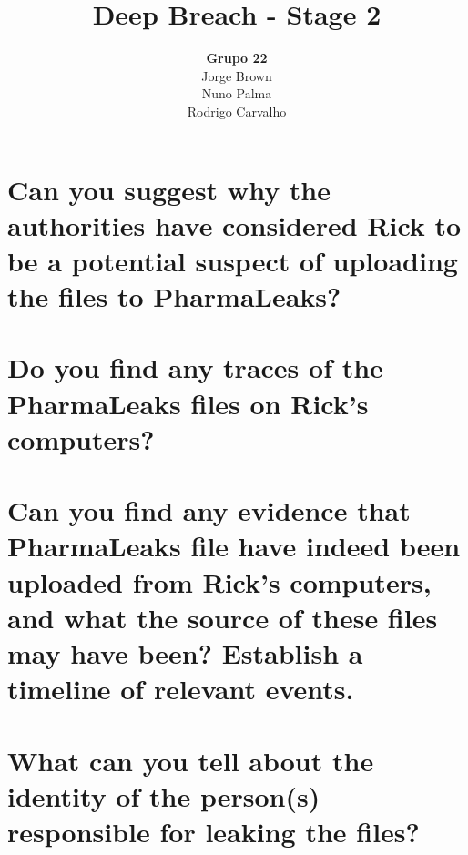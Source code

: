 \documentclass{report}
\author{\textbf{\huge{Grupo 22}}\vspace{2cm}\\Jorge Brown\\Nuno Palma\\Rodrigo Carvalho}
\title{\textbf{\Huge{Deep Breach - Stage 2}}}
\begin{document}
    \maketitle
    \tableofcontents
    \newpage

    \section{Can you suggest why the authorities have considered Rick to be a potential suspect of uploading the files to PharmaLeaks?}
    

    \section{Do you find any traces of the PharmaLeaks files on Rick’s computers?}
    

    \section{Can you find any evidence that PharmaLeaks file have indeed been uploaded from Rick’s computers, and what the source of these files may have been? Establish a timeline of relevant events.}
    

    \section{What can you tell about the identity of the person(s) responsible for leaking the files?}
    
\end{document}
